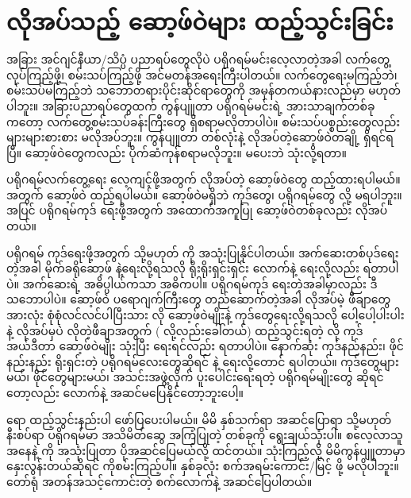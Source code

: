 \chapter{လိုအပ်သည့် ဆော့ဖ်ဝဲများ ထည့်သွင်းခြင်း} \label{apdx1}

အခြား အင်ဂျင်နီယာ/သိပ္ပံ ပညာရပ်တွေလိုပဲ ပရိုဂရမ်မင်းလေ့လာတဲ့အခါ လက်တွေ့လုပ်ကြည့်ဖို့၊ စမ်းသပ်ကြည့်ဖို့ အင်မတန်အရေးကြီးပါတယ်။ လက်တွေရေးမကြည့်ဘဲ၊ စမ်းသပ်မကြည့်ဘဲ သဘောတရားပိုင်းဆိုင်ရာတွေကို အမှန်တကယ်နားလည်မှာ မဟုတ်ပါဘူး။ အခြားပညာရပ်တွေထက် ကွန်ပျူတာ ပရိုဂရမ်မင်းရဲ့ အားသာချက်တစ်ခုကတော့ လက်တွေ့စမ်းသပ်ခန်းကြီးတွေ ရှိစရာမလိုတာပါပဲ။ စမ်းသပ်ပစ္စည်းတွေလည်း များများစားစား မလိုအပ်ဘူး။ ကွန်ပျူတာ တစ်လုံးနဲ့ လိုအပ်တဲ့ဆော့ဖ်ဝဲတချို့ ရှိရင်ရပြီ။ ဆော့ဖ်ဝဲတွေကလည်း ပိုက်ဆံကုန်စရာမလိုဘူး။ မပေးဘဲ သုံးလို့ရတာ။ 

ပရိုဂရမ်လက်တွေ့ရေး လေ့ကျင့်ဖို့အတွက် လိုအပ်တဲ့ ဆော့ဖ်ဝဲတွေ ထည့်ထားရပါမယ်။  အတွက်  ဆော့ဖ်ဝဲ ထည့်ရပါမယ်။  ဆော့ဖ်ဝဲမရှိဘဲ  ကုဒ်တွေ၊  ပရိုဂရမ်တွေ  လို့ မရပါဘူး။   အပြင် ပရိုဂရမ်ကုဒ် ရေးဖို့အတွက် အထောက်အကူပြု ဆော့ဖ်ဝဲတစ်ခုလည်း လိုအပ်တယ်။

ပရိုဂရမ် ကုဒ်ရေးဖို့အတွက်  သို့မဟုတ်  ကို အသုံးပြုနိုင်ပါတယ်။ အက်ဆေးတစ်ပုဒ်ရေးတဲ့အခါ မိုက်ခရိုဆော့ဖ်  နဲ့ရေးလို့ရသလို ရိုးရိုးရှင်းရှင်း   လောက်နဲ့ ရေးလို့လည်း ရတာပါပဲ။ အက်ဆေးရဲ့ အဓိပ္ပါယ်ကသာ အဓိကပါ။ ပရိုဂရမ်ကုဒ် ရေးတဲ့အခါမှာလည်း ဒီသဘောပါပဲ။ ဆော့ဖ်ဝဲ ပရောဂျက်ကြီးတွေ တည်ဆောက်တဲ့အခါ လိုအပ်မဲ့ ဖီချာတွေအားလုံး စုံစုံလင်လင်ပါပြီးသား  လို  ဆော့ဖ်ဝဲမျိုးနဲ့ ကုဒ်တွေရေးလို့ရသလို  ပေါ့ပေါ့ပါးပါးနဲ့ လိုအပ်မှပဲ လိုတဲ့ဖီချာအတွက်  ( လို့လည်းခေါ်တယ်) ထည့်သွင်းရတဲ့  လို ကုဒ်အယ်ဒီတာ  ဆော့ဖ်ဝဲမျိုး သုံးပြီး ရေးရင်လည်း ရတာပါပဲ။ နောက်ဆုံး ကုဒ်နည်နည်း၊ ဖိုင်နည်းနည်း ရိုးရှင်းတဲ့ ပရိုဂရမ်လေးတွေဆိုရင်  နဲ့ ရေးလို့တောင် ရပါတယ်။ ကုဒ်တွေများမယ်၊ ဖိုင်တွေများမယ်၊ အသင်းအဖွဲ့လိုက် ပူးပေါင်းရေးရတဲ့ ပရိုဂရမ်မျိုးတွေ ဆိုရင်တော့လည်း  လောက်နဲ့ အဆင်မပြေနိုင်တော့ဘူးပေါ့။ 

 ရော   ထည့်သွင်းနည်းပါ ဖော်ပြပေးပါမယ်။ မိမိ နှစ်သက်ရာ အဆင်ပြောရာ သို့မဟုတ် နီးစပ်ရာ ပရိုဂရမ်မာ အသိမိတ်ဆွေ အကြံပြုတဲ့  တစ်ခုကို ရွေးချယ်သုံးပါ။ စလေ့လာသူအနေနဲ့  ကို အသုံးပြုတာ ပိုအဆင်ပြေမယ်လို့ ထင်တယ်။  သုံးကြည့်လို့ မိမိကွန်ပျူတာမှာ နှေးလွန်းတယ်ဆိုရင်  ကိုစမ်းကြည့်ပါ။ နှစ်ခုလုံး စက်အရမ်းကောင်း/မြင့် ဖို့ မလိုပါဘူး။ တော်ရုံ အတန်အသင့်ကောင်းတဲ့ စက်လောက်နဲ့ အဆင်ပြေပါတယ်။

